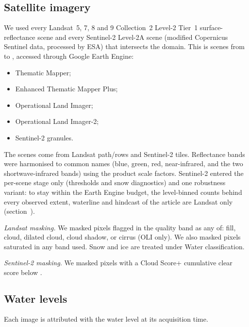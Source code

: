 \subsection*{Satellite imagery}
We used every Landsat~5, 7, 8 and 9 Collection~2 Level-2 Tier~1 surface-reflectance scene\citep{usgs_l45tm_c2l2,usgs_l7etm_c2l2,usgs_l89oli_c2l2} and every Sentinel-2 Level-2A scene (modified Copernicus Sentinel data, processed by ESA) that intersects the domain. This is  scenes from  to , accessed through Google Earth Engine:
\begin{itemize}
  \item {} Thematic Mapper;
  \item {} Enhanced Thematic Mapper Plus;
  \item {} Operational Land Imager;
  \item {} Operational Land Imager-2;
  \item {} Sentinel-2 granules.
\end{itemize}
The scenes come from  Landsat path/rows and  Sentinel-2 tiles. Reflectance bands were harmonised to common names (blue, green, red, near-infrared, and the two shortwave-infrared bands) using the product scale factors. Sentinel-2 entered the per-scene stage only (thresholds and snow diagnostics) and one robustness variant: to stay within the Earth Engine budget, the level-binned counts behind every observed extent, waterline and hindcast of the article are Landsat only (section~\SIdeviations).

\emph{Landsat masking.} We masked pixels flagged in the quality band\citep{usgs_l45tm_c2l2,usgs_l7etm_c2l2,usgs_l89oli_c2l2} as any of: fill, cloud, dilated cloud, cloud shadow, or cirrus (OLI only). We also masked pixels saturated in any band used. Snow and ice are treated under Water classification.

\emph{Sentinel-2 masking.} We masked pixels with a Cloud Score+ cumulative clear score below \citep{pasquarella2023}.

\subsection*{Water levels}
Each image is attributed with the water level at its acquisition time.

